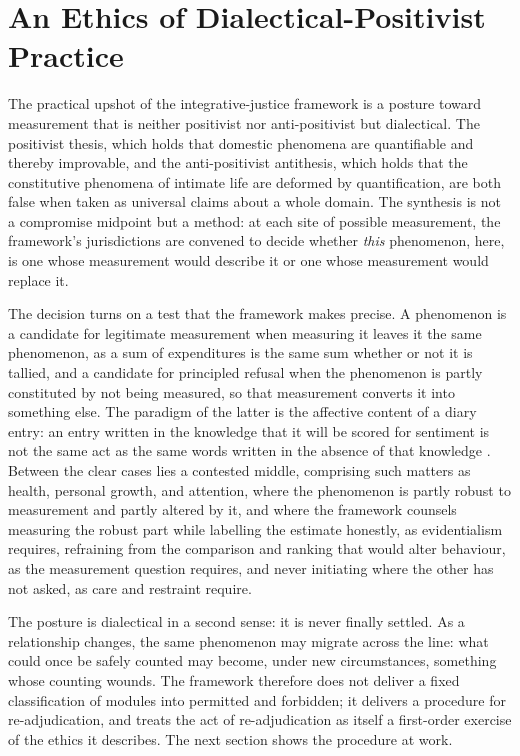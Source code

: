 \documentclass[11pt,a4paper]{article}
\begin{document}
\section{An Ethics of Dialectical-Positivist Practice}\label{p01:sec:dialectic}

The practical upshot of the integrative-justice framework is a posture toward measurement that is neither positivist nor anti-positivist but dialectical. The positivist thesis, which holds that domestic phenomena are quantifiable and thereby improvable, and the anti-positivist antithesis, which holds that the constitutive phenomena of intimate life are deformed by quantification, are both false when taken as universal claims about a whole domain. The synthesis is not a compromise midpoint but a method: at each site of possible measurement, the framework's jurisdictions are convened to decide whether \emph{this} phenomenon, here, is one whose measurement would describe it or one whose measurement would replace it.

The decision turns on a test that the framework makes precise. A phenomenon is a candidate for legitimate measurement when measuring it leaves it the same phenomenon, as a sum of expenditures is the same sum whether or not it is tallied, and a candidate for principled refusal when the phenomenon is partly constituted by not being measured, so that measurement converts it into something else. The paradigm of the latter is the affective content of a diary entry: an entry written in the knowledge that it will be scored for sentiment is not the same act as the same words written in the absence of that knowledge \parencite{howell2018emotional, boehner2007how}. Between the clear cases lies a contested middle, comprising such matters as health, personal growth, and attention, where the phenomenon is partly robust to measurement and partly altered by it, and where the framework counsels measuring the robust part while labelling the estimate honestly, as evidentialism requires, refraining from the comparison and ranking that would alter behaviour, as the measurement question requires, and never initiating where the other has not asked, as care and restraint require.

The posture is dialectical in a second sense: it is never finally settled. As a relationship changes, the same phenomenon may migrate across the line: what could once be safely counted may become, under new circumstances, something whose counting wounds. The framework therefore does not deliver a fixed classification of modules into permitted and forbidden; it delivers a procedure for re-adjudication, and treats the act of re-adjudication as itself a first-order exercise of the ethics it describes. The next section shows the procedure at work.
\end{document}
